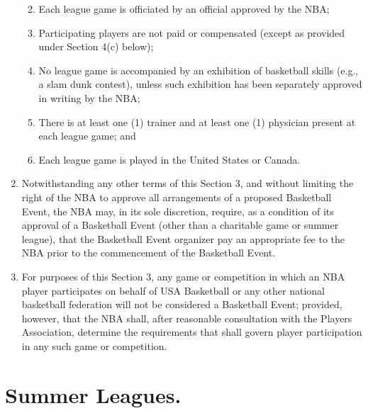 \documentclass[
]{book}
\providecommand{\tightlist}{%
  \setlength{\itemsep}{0pt}\setlength{\parskip}{0pt}}
\begin{document}
\begin{enumerate}
  \begin{enumerate}
  \def\labelenumii{(\roman{enumii})}
  \tightlist
  \item
    Each league game is officiated by an official approved by the NBA;
  \item
    Participating players are not paid or compensated (except as provided under Section 4(c) below);
  \item
    No league game is accompanied by an exhibition of basketball skills (e.g., a slam dunk contest), unless such exhibition has been separately approved in writing by the NBA;
  \item
    There is at least one (1) trainer and at least one (1) physician present at each league game; and
  \item
    Each league game is played in the United States or Canada.
  \end{enumerate}
\item
  Notwithstanding any other terms of this Section 3, and without limiting the right of the NBA to approve all arrangements of a proposed Basketball Event, the NBA may, in its sole discretion, require, as a condition of its approval of a Basketball Event (other than a charitable game or summer league), that the Basketball Event organizer pay an appropriate fee to the NBA prior to the commencement of the Basketball Event.
\item
  For purposes of this Section 3, any game or competition in which an NBA player participates on behalf of USA Basketball or any other national basketball federation will not be considered a Basketball Event; provided, however, that the NBA shall, after reasonable consultation with the Players Association, determine the requirements that shall govern player participation in any such game or competition.
\end{enumerate}

\hypertarget{summer-leagues.}{%
\section{Summer Leagues.}\label{summer-leagues.}}
\end{document}
